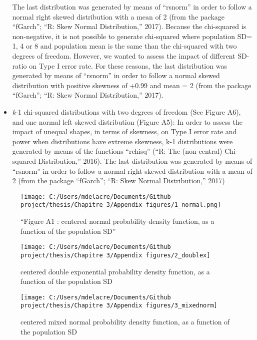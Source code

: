 \documentclass[
]{article}
\begin{document}
\begin{itemize}
  The last distribution was generated by means of ``rsnorm'' in order to
  follow a normal right skewed distribution with a mean of 2 (from the
  package ``fGarch''; ``R: Skew Normal Distribution,'' 2017). Because
  the chi-squared is non-negative, it is not possible to generate
  chi-squared where population SD= 1, 4 or 8 and population mean is the
  same than the chi-squared with two degrees of freedom. However, we
  wanted to assess the impact of different SD-ratio on Type I error
  rate. For these reasons, the last distribution was generated by means
  of ``rsnorm'' in order to follow a normal skewed distribution with
  positive skewness of +0.99 and mean = 2 (from the package ``fGarch'';
  ``R: Skew Normal Distribution,'' 2017).
\item
  \emph{k}-1 chi-squared distributions with two degrees of freedom (See
  Figure A6), and one normal left skewed distribution (Figure A5): In
  order to assess the impact of unequal shapes, in terms of skewness, on
  Type I error rate and power when distributions have extreme skewness,
  k-1 distributions were generated by means of the functions ``rchisq''
  (``R: The (non-central) Chi-squared Distribution,'' 2016). The last
  distribution was generated by means of ``rsnorm'' in order to follow a
  normal right skewed distribution with a mean of 2 (from the package
  ``fGarch''; ``R: Skew Normal Distribution,'' 2017)
\end{itemize}

\begin{figure}
\centering
\texttt{[image: C:/Users/mdelacre/Documents/Github project/thesis/Chapitre 3/Appendix figures/1\_normal.png]}
\caption{``Figure A1 : centered normal probability density function, as
a function of the population SD''}
\end{figure}

\begin{figure}
\texttt{[image: C:/Users/mdelacre/Documents/Github project/thesis/Chapitre 3/Appendix figures/2\_doublex]} \caption{centered double exponential probability density function, as a function of the population SD}\label{fig:unnamed-chunk-4}
\end{figure}

\begin{figure}
\texttt{[image: C:/Users/mdelacre/Documents/Github project/thesis/Chapitre 3/Appendix figures/3\_mixednorm]} \caption{centered mixed normal probability density function, as a function of the population SD}\label{fig:unnamed-chunk-5}
\end{figure}
\end{document}

